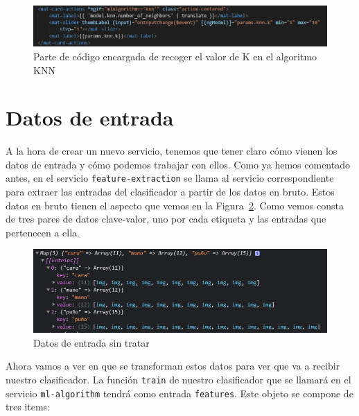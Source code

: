 \documentclass[a4paper, 12pt]{book}
\begin{document}
\begin{figure}
	\centering
	\includegraphics[width=12cm, keepaspectratio]{img/nvecinosknn}
	\caption{Parte de código encargada de recoger el valor de K en el algoritmo KNN}				
     \label{fig:nvecinosknn}
\end{figure}

\section{Datos de entrada} 
\label{sec:datosdeentrada}

A la hora de crear un nuevo servicio, tenemos que tener claro cómo vienen los datos de entrada y cómo podemos trabajar con ellos. Como ya hemos comentado antes, en el servicio \texttt{feature-extraction} se llama al servicio correspondiente para extraer las entradas del clasificador a partir de los datos en bruto. Estos datos en bruto tienen el aspecto que vemos en la Figura~\ref{fig:datosenbruto}. Como vemos consta de tres pares de datos clave-valor, uno por cada etiqueta y las entradas que pertenecen a ella.

\begin{figure}
	\centering
	\includegraphics[width=12cm, keepaspectratio]{img/datosenbruto}
	\caption{Datos de entrada sin tratar}				
	\label{fig:datosenbruto}
\end{figure}

Ahora vamos a ver en que se transforman estos datos para ver que va a recibir nuestro clasificador. La función \texttt{train} de nuestro clasificador que se llamará en el servicio \texttt{ml-algorithm} tendrá como entrada \texttt{features}. Este objeto se compone de tres items:
\end{document}
